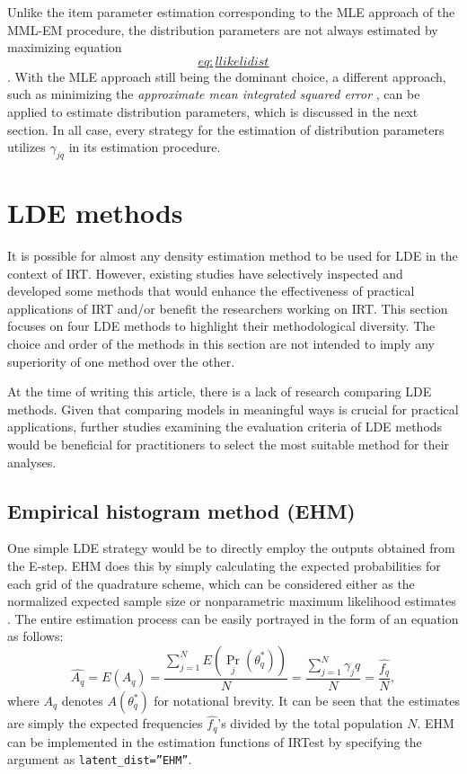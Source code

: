 Unlike the item parameter estimation corresponding to the MLE approach
of the MML-EM procedure, the distribution parameters are not always
estimated by maximizing equation
\protect\hyperlink{eq:llikelidist}{\[eq:llikelidist\]}. With the MLE approach still being the
dominant choice, a different approach, such as minimizing the
\emph{approximate mean integrated squared error} \citep{Li:2022}, can be applied
to estimate distribution parameters, which is discussed in the next
section. In all case, every strategy for the estimation of distribution
parameters utilizes \(\gamma_{jq}\) in its estimation procedure.

\hypertarget{lde-methods}{%
\section{LDE methods}\label{lde-methods}}

It is possible for almost any density estimation method to be used for
LDE in the context of IRT. However, existing studies have selectively
inspected and developed some methods that would enhance the
effectiveness of practical applications of IRT and/or benefit the
researchers working on IRT. This section focuses on four LDE methods to
highlight their methodological diversity. The choice and order of the
methods in this section are not intended to imply any superiority of one
method over the other.

At the time of writing this article, there is a lack of research
comparing LDE methods. Given that comparing models in meaningful ways is
crucial for practical applications, further studies examining the
evaluation criteria of LDE methods would be beneficial for practitioners
to select the most suitable method for their analyses.

\hypertarget{empirical-histogram-method-ehm}{%
\subsection{Empirical histogram method (EHM)}\label{empirical-histogram-method-ehm}}

One simple LDE strategy would be to directly employ the outputs obtained
from the E-step. EHM does this by simply calculating the expected
probabilities for each grid of the quadrature scheme, which can be
considered either as the normalized expected sample size or
nonparametric maximum likelihood estimates
\citep{Bock+Aitkin:1981, Laird:1978, Mislevy:1984}. The entire estimation
process can be easily portrayed in the form of an equation as follows:
\[\hat{ A_{q}} =
E{\left( A_{q} \right)} =
\frac{\sum_{j = 1}^{N}{ E{\left(\Pr_{j}{\left( \theta_{q}^{*} \right)}\right)} }}{N} =
\frac{\sum_{j = 1}^{N}{\gamma_jq}}{N} =
\frac{\hat{f_q}}{N},
\label{eq:ehm}\] where \(A_{q}\) denotes
\(A{\left( \theta^{*}_{q} \right)}\) for notational brevity. It can be
seen that the estimates are simply the expected frequencies
\(\hat{f_q}\)'s divided by the total population \(N\). EHM can be
implemented in the estimation functions of IRTest by specifying the
argument as \texttt{latent\_dist=”EHM”}.

